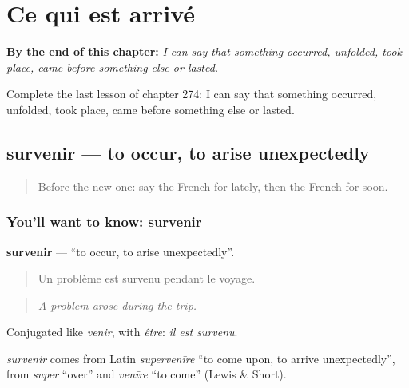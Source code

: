 
\chapter{Ce qui est arrivé}
\label{ch:fr-ce-qui-est-arrive}

\begin{chapteropening}
\textbf{By the end of this chapter:} \emph{I can say that something occurred, unfolded, took place, came before something else or lasted.}

Complete the last lesson of chapter 274: I can say that something occurred, unfolded, took place, came before something else or lasted.
\end{chapteropening}

\section[survenir]{survenir — to occur, to arise unexpectedly}

\label{lesson:FR-C274-survenir}



\begin{quote}
Before the new one: say the French for lately, then the French for soon.
\end{quote}

\subsection*{You'll want to know: survenir}
\textbf{survenir} — \textquotedblleft{}to occur, to arise unexpectedly\textquotedblright{}.

\begin{quote}
Un problème est survenu pendant le voyage.
\end{quote}

\begin{quote}
\emph{A problem arose during the trip.}
\end{quote}

Conjugated like \emph{venir}, with \emph{être}: \emph{il est survenu}.

\begin{cousinweb}
\emph{survenir} comes from Latin \emph{supervenīre} \textquotedblleft{}to come upon, to arrive unexpectedly\textquotedblright{}, from \emph{super} \textquotedblleft{}over\textquotedblright{} and \emph{venīre} \textquotedblleft{}to come\textquotedblright{} (Lewis \& Short).
\end{cousinweb}

